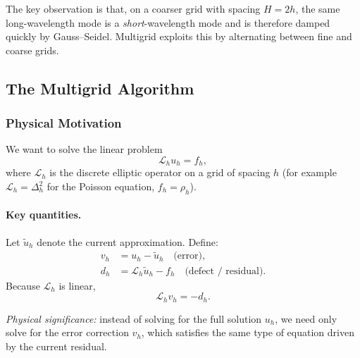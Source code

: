 The key observation is that, on a coarser grid with spacing $H=2h$,
the same long-wavelength mode is a \emph{short}-wavelength mode and
is therefore damped quickly by Gauss–Seidel.  Multigrid exploits this
by alternating between fine and coarse grids.

\subsection{The Multigrid Algorithm}\label{subsec:lec08:multigrid}

\subsubsection*{Physical Motivation}
We want to solve the linear problem
\begin{equation}
  \mathcal{L}_h u_h = f_h,
  \label{eq:lec08:fine-problem}
\end{equation}
where $\mathcal{L}_h$ is the discrete elliptic operator on a grid of
spacing $h$ (for example $\mathcal{L}_h = \Delta^2_h$ for the Poisson
equation, $f_h = \rho_h$).

\paragraph{Key quantities.}
Let $\tilde{u}_h$ denote the current approximation.  Define:
\begin{align}
  v_h &= u_h - \tilde{u}_h \quad \text{(error)},
  \label{eq:lec08:error}\\
  d_h &= \mathcal{L}_h\tilde{u}_h - f_h \quad \text{(defect / residual)}.
  \label{eq:lec08:defect}
\end{align}
Because $\mathcal{L}_h$ is linear,
\begin{equation}
  \mathcal{L}_h v_h = -d_h.
  \label{eq:lec08:error-equation}
\end{equation}

\textit{Physical significance:} instead of solving for the full
solution $u_h$, we need only solve for the error correction $v_h$,
which satisfies the same type of equation driven by the current
residual.

